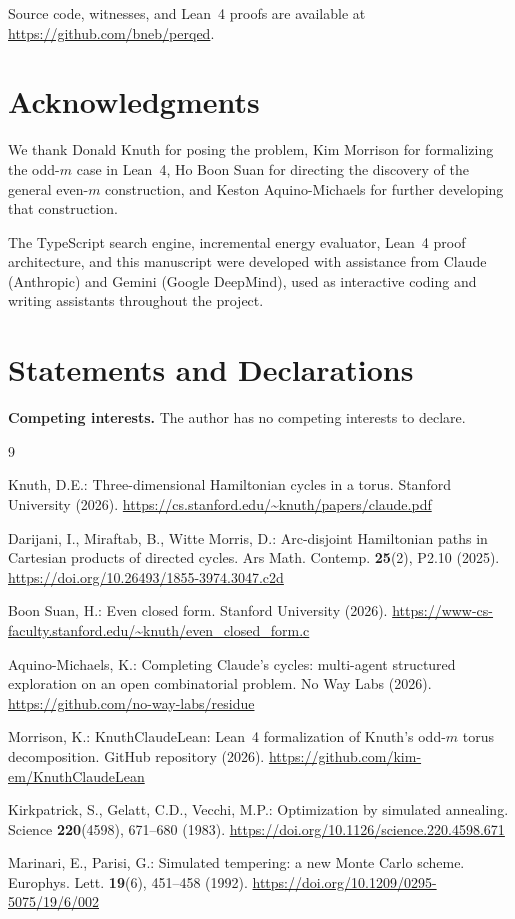 \documentclass[11pt]{article}
\theoremstyle{plain}
\begin{document}
Source code, witnesses, and Lean~4 proofs are available at
\url{https://github.com/bneb/perqed}.

\section*{Acknowledgments}

We thank Donald Knuth for posing the problem, Kim Morrison for formalizing
the odd-$m$ case in Lean~4, Ho Boon Suan for directing the discovery of the
general even-$m$ construction, and Keston Aquino-Michaels for further
developing that construction.

The TypeScript search engine, incremental energy evaluator, Lean~4 proof
architecture, and this manuscript were developed with assistance from
Claude (Anthropic) and Gemini (Google DeepMind), used as interactive
coding and writing assistants throughout the project.

\section*{Statements and Declarations}

\textbf{Competing interests.} The author has no competing interests to declare.

\begin{thebibliography}{9}

Knuth, D.E.: Three-dimensional Hamiltonian cycles in a torus.
Stanford University (2026).
\url{https://cs.stanford.edu/~knuth/papers/claude.pdf}

Darijani, I., Miraftab, B., Witte Morris, D.: Arc-disjoint Hamiltonian
paths in Cartesian products of directed cycles.
Ars Math. Contemp. \textbf{25}(2), P2.10 (2025).
\url{https://doi.org/10.26493/1855-3974.3047.c2d}

Boon Suan, H.: Even closed form. Stanford University (2026).
\url{https://www-cs-faculty.stanford.edu/~knuth/even_closed_form.c}

Aquino-Michaels, K.: Completing Claude's cycles: multi-agent structured
exploration on an open combinatorial problem. No Way Labs (2026).
\url{https://github.com/no-way-labs/residue}

Morrison, K.: KnuthClaudeLean: Lean~4 formalization of Knuth's odd-$m$
torus decomposition. GitHub repository (2026).
\url{https://github.com/kim-em/KnuthClaudeLean}

Kirkpatrick, S., Gelatt, C.D., Vecchi, M.P.: Optimization by simulated
annealing. Science \textbf{220}(4598), 671--680 (1983).
\url{https://doi.org/10.1126/science.220.4598.671}

Marinari, E., Parisi, G.: Simulated tempering: a new Monte Carlo scheme.
Europhys. Lett. \textbf{19}(6), 451--458 (1992).
\url{https://doi.org/10.1209/0295-5075/19/6/002}

\end{thebibliography}
\end{document}
